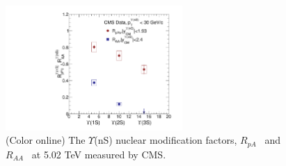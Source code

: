 

\begin{figure}
  \begin{center}
  \includegraphics[width=0.60\textwidth]{Figures/ExpOverview/Fig_LHC_YnSRPPbRAAInt.pdf}
  \caption{(Color online) The $\Upsilon$(nS) nuclear modification factors,
    $R_{pA}$~\cite{CMS:2022wfi} and $R_{AA}$~\cite{CMS:2018zza}
    at 5.02 TeV measured by CMS.
  }
  \end{center}
 \label{fig:LHCpBPbPb}
\end{figure}



  

